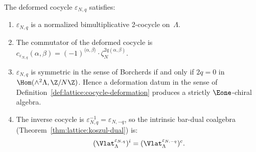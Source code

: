 \begin{proposition}
\label{prop:lattice:deformation-properties}
The deformed cocycle $\varepsilon_{N,q}$ satisfies:
\begin{enumerate}[label=(\roman*)]
\item $\varepsilon_{N,q}$ is a normalized bimultiplicative 2-cocycle
 on~$\Lambda$.
\item The commutator of the deformed cocycle is
 $c_{\varepsilon_{N,q}}(\alpha,\beta)
 = (-1)^{\langle\alpha,\beta\rangle}
 \cdot \zeta_N^{2q(\alpha,\beta)}$.
\item $\varepsilon_{N,q}$ is symmetric in the sense of Borcherds
 if and only if $2q=0$ in
 $\Hom(\wedge^2\Lambda,\Z/N\Z)$. Hence a deformation datum in the
 sense of Definition~\textup{\ref{def:lattice:cocycle-deformation}}
 produces a strictly $\Eone$-chiral algebra.
\item The inverse cocycle is
 $\varepsilon_{N,q}^{-1} = \varepsilon_{N,-q}$, so the intrinsic
 bar-dual coalgebra
 \textup{(}Theorem~\textup{\ref{thm:lattice:koszul-dual})} is:
 \begin{equation}\label{eq:lattice:deformed-koszul-dual}
 (\Vlat_\Lambda^{\varepsilon_{N,q}})^i
 = (\Vlat_\Lambda^{\varepsilon_{N,-q}})^c.
 \end{equation}
\end{enumerate}
\end{proposition}

